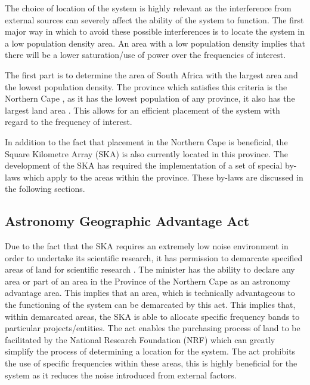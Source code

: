\documentclass[11pt]{witseiepaper}
\begin{document}
\begin{bibunit}[witseie]
The choice of location of the system is highly relevant as the interference from external sources can severely affect the ability of the system to function. The first major way in which to avoid these possible interferences is to locate the system in a low population density area. An area with a low population density implies that there will be a lower saturation/use of power over the frequencies of interest.

The first part is to determine the area of South Africa with the largest area and the lowest population density. The province which satisfies this criteria is the Northern Cape \cite[p.~18]{statsSASurvey1}, as it has the lowest population of any province, it also has the largest land area \cite[p.~9,15]{statsSASurvey2}. This allows for an efficient placement of the system with regard to the frequency of interest.

In addition to the fact that placement in the Northern Cape is beneficial, the Square Kilometre Array (SKA) is also currently located in this province. The development of the SKA has required the implementation of a set of special by-laws which apply to the areas within the province. These by-laws are discussed in the following sections.


\subsection{Astronomy Geographic Advantage Act} \label{sec:AstronomyGeographicAdvantageAct}
Due to the fact that the SKA requires an extremely low noise environment in order to undertake its scientific research, it has permission to demarcate specified areas of land for scientific research \cite{SKAActDescription}. 
The minister has the ability to declare any area or part of an area in the Province of the Northern Cape as an astronomy advantage area. This implies that an area, which is technically advantageous to the functioning of the system can be demarcated by this act. This implies that, within demarcated areas, the SKA is able to allocate specific frequency bands to particular projects/entities. 
The act enables the purchasing process of land to be facilitated by the National Research Foundation (NRF) which can greatly simplify the process of determining a location for the system. The act prohibits the use of specific frequencies within these areas, this is highly beneficial for the system as it reduces the noise introduced from external factors.


\end{bibunit}
\end{document}
